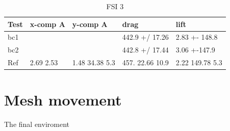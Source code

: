 \begin{table}[h!]
\centering
\caption{FSI 3}
\label{my-label}
\begin{tabular}{lllll}
 \hline
Test & x-comp A          & y-comp A             & drag                   & lift                 \\
 \hline
bc1 &                   &                      & 442.9 +/ 17.26         & 2.83 +- 148.8        \\
 \hline
bc2 &                   &                      & 442.8 +/ 17.44         & 3.06 +-147.9         \\
 \hline
Ref & 2.69  2.53  &   1.48  34.38 5.3   & 457. 22.66 10.9 & 2.22 149.78 5.3 \\
 \hline
\end{tabular}
\end{table}


\section{Mesh movement}
The final enviroment 